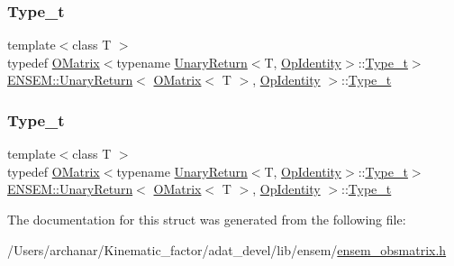 \subsubsection{\texorpdfstring{Type\_t}{Type\_t}\hspace{0.1cm}{\footnotesize\ttfamily [1/2]}}
{\footnotesize\ttfamily template$<$class T $>$ \\
typedef \mbox{\hyperlink{classENSEM_1_1OMatrix}{O\+Matrix}}$<$typename \mbox{\hyperlink{structENSEM_1_1UnaryReturn}{Unary\+Return}}$<$T, \mbox{\hyperlink{structENSEM_1_1OpIdentity}{Op\+Identity}}$>$\+::\mbox{\hyperlink{structENSEM_1_1UnaryReturn_3_01OMatrix_3_01T_01_4_00_01OpIdentity_01_4_a7f4dcdf040c4857ee984e5fbf4813fc6}{Type\+\_\+t}}$>$ \mbox{\hyperlink{structENSEM_1_1UnaryReturn}{E\+N\+S\+E\+M\+::\+Unary\+Return}}$<$ \mbox{\hyperlink{classENSEM_1_1OMatrix}{O\+Matrix}}$<$ T $>$, \mbox{\hyperlink{structENSEM_1_1OpIdentity}{Op\+Identity}} $>$\+::\mbox{\hyperlink{structENSEM_1_1UnaryReturn_3_01OMatrix_3_01T_01_4_00_01OpIdentity_01_4_a7f4dcdf040c4857ee984e5fbf4813fc6}{Type\+\_\+t}}}

\mbox{\label{structENSEM_1_1UnaryReturn_3_01OMatrix_3_01T_01_4_00_01OpIdentity_01_4_a7f4dcdf040c4857ee984e5fbf4813fc6}} 
\subsubsection{\texorpdfstring{Type\_t}{Type\_t}\hspace{0.1cm}{\footnotesize\ttfamily [2/2]}}
{\footnotesize\ttfamily template$<$class T $>$ \\
typedef \mbox{\hyperlink{classENSEM_1_1OMatrix}{O\+Matrix}}$<$typename \mbox{\hyperlink{structENSEM_1_1UnaryReturn}{Unary\+Return}}$<$T, \mbox{\hyperlink{structENSEM_1_1OpIdentity}{Op\+Identity}}$>$\+::\mbox{\hyperlink{structENSEM_1_1UnaryReturn_3_01OMatrix_3_01T_01_4_00_01OpIdentity_01_4_a7f4dcdf040c4857ee984e5fbf4813fc6}{Type\+\_\+t}}$>$ \mbox{\hyperlink{structENSEM_1_1UnaryReturn}{E\+N\+S\+E\+M\+::\+Unary\+Return}}$<$ \mbox{\hyperlink{classENSEM_1_1OMatrix}{O\+Matrix}}$<$ T $>$, \mbox{\hyperlink{structENSEM_1_1OpIdentity}{Op\+Identity}} $>$\+::\mbox{\hyperlink{structENSEM_1_1UnaryReturn_3_01OMatrix_3_01T_01_4_00_01OpIdentity_01_4_a7f4dcdf040c4857ee984e5fbf4813fc6}{Type\+\_\+t}}}



The documentation for this struct was generated from the following file\+:\begin{DoxyCompactItemize}
\item 
/\+Users/archanar/\+Kinematic\+\_\+factor/adat\+\_\+devel/lib/ensem/\mbox{\hyperlink{lib_2ensem_2ensem__obsmatrix_8h}{ensem\+\_\+obsmatrix.\+h}}\end{DoxyCompactItemize}
